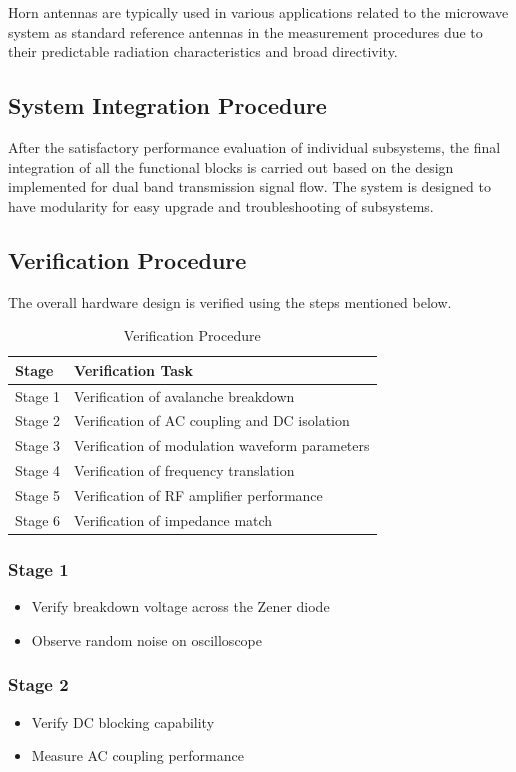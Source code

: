 \documentclass[12pt,a4paper]{report}
\begin{document}
	Horn antennas are typically used in various applications related to the microwave system as standard reference antennas in the measurement procedures due to their predictable radiation characteristics and broad directivity.
	\subsection{System Integration Procedure}
	After the satisfactory performance evaluation of individual subsystems, the final integration of all the functional blocks is carried out based on the design implemented for dual band transmission signal flow. The system is designed to have modularity for easy upgrade and troubleshooting of subsystems.
	\subsection{Verification Procedure}
	The overall hardware design is verified using the steps mentioned below.
	
	\begin{table}[htbp]
		\centering
		\caption{Verification Procedure}
		\label{tab:verification_procedure}
		\begin{tabular}{p{3cm} p{8cm}}
			\toprule
			\textbf{Stage} & \textbf{Verification Task} \\
			\midrule
			Stage 1 & Verification of avalanche breakdown \\
			Stage 2 & Verification of AC coupling and DC isolation \\
			Stage 3 & Verification of modulation waveform parameters \\
			Stage 4 & Verification of frequency translation \\
			Stage 5 & Verification of RF amplifier performance \\
			Stage 6 & Verification of impedance match \\
			\bottomrule
		\end{tabular}
	\end{table}
	\subsubsection{Stage 1}
	\begin{itemize}
		\item Verify breakdown voltage across the Zener diode
		\item Observe random noise on oscilloscope
	\end{itemize}
	\subsubsection{Stage 2}
	\begin{itemize}
		\item Verify DC blocking capability
		\item Measure AC coupling performance
	\end{itemize}
\end{document}

